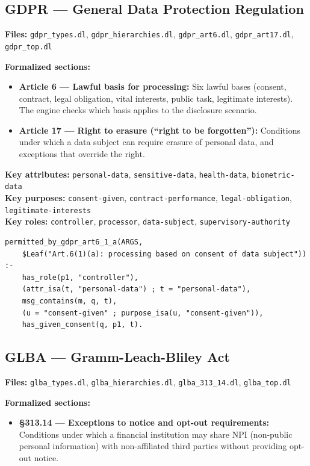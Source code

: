 \documentclass[11pt,letterpaper]{article}
\begin{document}
\begin{appendices}
\subsection{GDPR --- General Data Protection Regulation}

\textbf{Files:} \texttt{gdpr\_types.dl}, \texttt{gdpr\_hierarchies.dl}, \texttt{gdpr\_art6.dl}, \texttt{gdpr\_art17.dl}, \texttt{gdpr\_top.dl}

\textbf{Formalized sections:}
\begin{itemize}
  \item \textbf{Article 6 --- Lawful basis for processing:} Six lawful bases (consent, contract, legal obligation, vital interests, public task, legitimate interests). The engine checks which basis applies to the disclosure scenario.
  \item \textbf{Article 17 --- Right to erasure (``right to be forgotten''):} Conditions under which a data subject can require erasure of personal data, and exceptions that override the right.
\end{itemize}

\textbf{Key attributes:} \texttt{personal-data}, \texttt{sensitive-data}, \texttt{health-data}, \texttt{biometric-data}\\
\textbf{Key purposes:} \texttt{consent-given}, \texttt{contract-performance}, \texttt{legal-obligation}, \texttt{legitimate-interests}\\
\textbf{Key roles:} \texttt{controller}, \texttt{processor}, \texttt{data-subject}, \texttt{supervisory-authority}

\begin{lstlisting}[style=soufflestyle,caption={GDPR Article 6(1)(a) lawful basis (consent) rule}]
permitted_by_gdpr_art6_1_a(ARGS,
    $Leaf("Art.6(1)(a): processing based on consent of data subject")) :-
    has_role(p1, "controller"),
    (attr_isa(t, "personal-data") ; t = "personal-data"),
    msg_contains(m, q, t),
    (u = "consent-given" ; purpose_isa(u, "consent-given")),
    has_given_consent(q, p1, t).
\end{lstlisting}

\subsection{GLBA --- Gramm-Leach-Bliley Act}

\textbf{Files:} \texttt{glba\_types.dl}, \texttt{glba\_hierarchies.dl}, \texttt{glba\_313\_14.dl}, \texttt{glba\_top.dl}

\textbf{Formalized sections:}
\begin{itemize}
  \item \textbf{\S 313.14 --- Exceptions to notice and opt-out requirements:} Conditions under which a financial institution may share NPI (non-public personal information) with non-affiliated third parties without providing opt-out notice.
\end{itemize}


\end{appendices}
\end{document}
